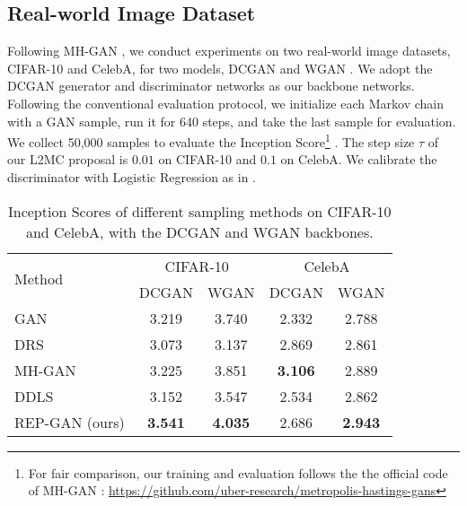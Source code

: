 \documentclass[runningheads]{llncs}
\newcommand{\<}{\left\langle}
\renewcommand{\>}{\right\rangle}
\begin{document}
\subsection{Real-world Image Dataset}

Following MH-GAN \cite{turner2019metropolis}, we conduct experiments on two real-world image datasets, CIFAR-10 and CelebA, for two models, DCGAN \cite{radford2015unsupervised} and WGAN \cite{arjovsky2017wasserstein}. We adopt the DCGAN generator and discriminator networks as our backbone networks.
Following the conventional evaluation protocol, we initialize each Markov chain with a GAN sample, run it for 640 steps, and take the last sample for evaluation. We collect 50,000 samples to evaluate the Inception Score\footnote{For fair comparison, our training and evaluation follows the the official code of MH-GAN \cite{turner2019metropolis}: \url{https://github.com/uber-research/metropolis-hastings-gans}} \cite{salimans2016improved}. 
The step size $\tau$ of our L2MC proposal is $0.01$ on CIFAR-10 and $0.1$ on CelebA. We calibrate the discriminator with Logistic Regression as in \cite{turner2019metropolis}. 


\begin{table}[t]\centering
    \caption{Inception Scores of different sampling methods on CIFAR-10 and CelebA, with the DCGAN and WGAN backbones.}
    \label{tab:cifar-10-incep-results}
    \begin{tabular}{lcccc}
    \toprule
    \multirow{2}{*}{Method} &  \multicolumn{2}{c}{CIFAR-10} &  \multicolumn{2}{c}{CelebA} \\
    & DCGAN & WGAN & DCGAN & WGAN \\
    \midrule
    GAN  & 3.219 & 3.740  & 2.332 & 2.788 \\
    DRS \cite{azadi2019discriminator} & 3.073 & 3.137 & 2.869 & 2.861 \\
    MH-GAN \cite{turner2019metropolis}  & 3.225 & 3.851 & \textbf{3.106} & 2.889 \\
    DDLS \cite{che2020your} & 3.152 & 3.547 & 2.534 & 2.862 \\    
    REP-GAN (ours)  & \textbf{3.541} & \textbf{4.035} & 2.686 & \textbf{2.943} \\
    \bottomrule
    \end{tabular}
\end{table}
\end{document}
